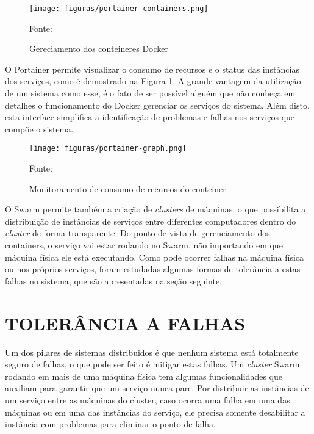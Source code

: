 \begin{figure}[H]
	\centering
	\caption{Gereciamento dos conteineres Docker}
	\texttt{[image: figuras/portainer-containers.png]}

	\label{fig:portainer-containers}
	\footnotesize Fonte: \fonteOAutor
\end{figure}

O Portainer permite visualizar o consumo de recursos e o status das instâncias
dos serviços, como é demostrado na Figura \ref{fig:portainer-containers}.
A grande vantagem da utilização de um sistema como esse, é o fato de ser
possível alguém que não conheça em detalhes o funcionamento do Docker gerenciar
os serviços do sistema. Além disto, esta interface simplifica a identificação
de problemas e falhas nos serviços que compõe o sistema.

\begin{figure}[H]
	\centering
	\caption{Monitoramento de consumo de recursos do conteiner}
	\texttt{[image: figuras/portainer-graph.png]}

	\label{fig:portainer-graph}
	\footnotesize Fonte: \fonteOAutor
\end{figure}

O Swarm permite também a criação de \emph{clusters} de máquinas, o que
possibilita a distribuição de instâncias de serviços entre diferentes
computadores dentro do \emph{cluster} de forma transparente. Do ponto de
vista de gerenciamento dos containers, o serviço vai estar rodando no
Swarm, não importando em que máquina física ele está executando. Como pode
ocorrer falhas na máquina física ou nos próprios serviços, foram estudadas
algumas formas de tolerância a estas falhas no sistema, que são apresentadas
na seção seguinte.

\section{TOLERÂNCIA A FALHAS}

Um dos pilares de sistemas distribuidos é que nenhum sistema está totalmente
seguro de falhas, o que pode ser feito é mitigar estas falhas. Um
\emph{cluster} Swarm rodando em mais de uma máquina física tem algumas
funcionalidades que auxiliam para garantir que um serviço nunca pare. Por
distribuir as instâncias de um serviço entre as máquinas do cluster, caso
ocorra uma falha em uma das máquinas ou em uma das instâncias do serviço, ele
precisa somente desabilitar a instância com problemas para eliminar o ponto de
falha.

